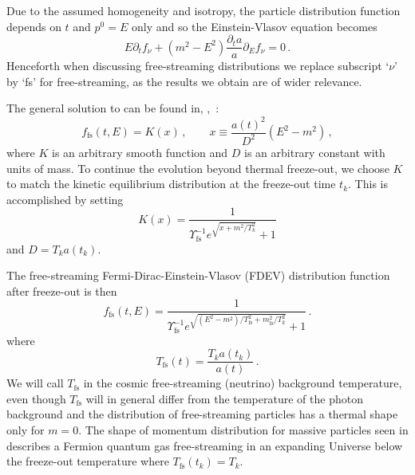 Due to the assumed homogeneity and isotropy, the particle distribution function depends on $t$ and $p^0=E$ only and so the Einstein-Vlasov equation becomes
\begin{equation}\label{VEeqFLR}
E\partial_tf_\nu+(m^2-E^2)\frac{\partial_ta}{a}\partial_{E}f_\nu=0\,.
\end{equation}
Henceforth when discussing free-streaming distributions we replace subscript `$\nu$' by `fs' for free-streaming, as the results we obtain are of wider relevance. 

The general solution to  can be found in, \eg,~\cite{Choquet-Bruhat:2009xil,Wong:2011ip}:
\begin{equation}
f_\mathrm{fs}(t,E)=K(x)\,,\qquad
x\equiv\frac{a(t)^2}{D^2}(E^2-m^2)\,,
\end{equation}
where $K$ is an arbitrary smooth function and $D$ is an arbitrary constant with units of mass. To continue the evolution beyond thermal freeze-out, we choose $K$ to match the kinetic equilibrium distribution  at the freeze-out time $t_k$. This is accomplished by setting
\begin{equation}
K(x)=\frac{1}{\Upsilon_\mathrm{fs}^{-1}e^{\sqrt{x+m^2/T_k^2}}+ 1}
\end{equation}
and $D=T_k a(t_k)$. 

The free-streaming Fermi-Dirac-Einstein-Vlasov (FDEV) distribution function after freeze-out is then
\begin{equation}\label{eq:NeutrinoDist}
f_\mathrm{fs}(t,E)=\frac{1}{\Upsilon_\mathrm{fs}^{-1}e^{\sqrt{(E^2-m^2)/T_\mathrm{fs}^2+m_\mathrm{fs}^2 /T_k^2}}+ 1}\,.
\end{equation}
where
\begin{equation}\label{eq:TneutrinoDist}
T_\mathrm{fs}(t)=\frac{T_ka(t_k)}{a(t)}\,. 
\end{equation}
We will call $T_\mathrm{fs}$ in  the cosmic free-streaming (neutrino) background temperature, even though $T_\mathrm{fs}$ will in general differ from the temperature of the photon background and the distribution of free-streaming particles has a thermal shape only for $m=0$. The shape of momentum distribution for massive particles seen in  describes a Fermion quantum gas free-streaming in an expanding Universe below the freeze-out temperature where $T_\mathrm{fs}(t_k)=T_k$. 

